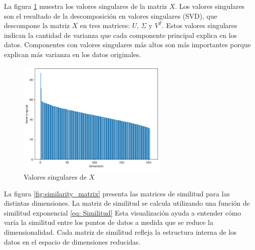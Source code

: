 \documentclass[12pt,a4]{article} %
\begin{document}
La figura \ref{fig:valores_singulares_X} muestra los valores singulares de la matriz $X$. Los valores singulares son el resultado de la descomposición en valores singulares (SVD), que descompone la matriz $X$ en tres matrices: $U$, $\Sigma$ y $V^T$. Estos valores singulares indican la cantidad de varianza que cada componente principal explica en los datos. Componentes con valores singulares más altos son más importantes porque explican más varianza en los datos originales.

\begin{figure}[H]
    \centering
    \includegraphics[width=0.65\textwidth]{latex_project/plots1/valores_singulares_martrizFULL.png}
    \caption{Valores singulares de $X$}
    \label{fig:valores_singulares_X}
\end{figure}

La figura \ref{fig:similarity_matrix} presenta las matrices de similitud para las distintas dimensiones. La matriz de similitud se calcula utilizando una función de similitud exponencial \ref{eq: Similitud} Esta visualización ayuda a entender cómo varía la similitud entre los puntos de datos a medida que se reduce la dimensionalidad. Cada matriz de similitud refleja la estructura interna de los datos en el espacio de dimensiones reducidas.
\end{document}
